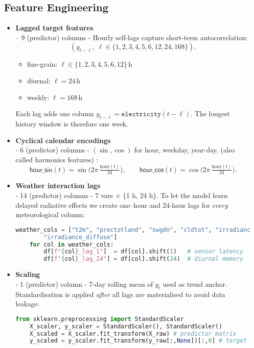 \subsection{Feature Engineering}
\label{subsec:feature-eng}

\begin{itemize}
    \item \textbf{Lagged target features} \\
    – 9 (predictor) columns - Hourly self‐lags capture short-term autocorrelation:
    \[
    (y_{t-\ell},\;\ell\in\{1,2,3,4,5,6,12,24,168\}).
    \]

    \begin{itemize}
        \item fine‐grain: $\ell\!\in\!\{1,2,3,4,5,6,12\}$\,h  
        \item diurnal:   $\ell=24$\,h  
        \item weekly:    $\ell=168$\,h
    \end{itemize}

    Each lag adds one column
    $y_{t-\ell}=\texttt{electricity}(t-\ell)$.  The longest history window is
    therefore one week.

    \item \textbf{Cyclical calendar encodings} \\
    - 6 (predictor) columns - $(\sin,\cos)$ for hour, weekday, year-day. (also called harmonics features) :
    \[
    \textsf{hour\_sin}(t)=\sin\!\bigl(2\pi\,\tfrac{\text{hour}(t)}{24}\bigr),\qquad
    \textsf{hour\_cos}(t)=\cos\!\bigl(2\pi\,\tfrac{\text{hour}(t)}{24}\bigr).
    \]
 
\newpage
    \item \textbf{Weather interaction lags} \\
    - 14 (predictor) columns - 7 vars $\times$ $\{$1 h, 24 h$\}$.
    To let the model learn delayed radiative effects we create one–hour and 24-hour lags for 
    \emph{every} meteorological column:
    \begin{lstlisting}[language=Python,caption={Python snippet: weather lag construction}]
        weather_cols = ["t2m", "prectotland", "swgdn", "cldtot", "irradiance_direct", 
        "irradiance_diffuse"]
    for col in weather_cols:
        df[f"{col}_lag_1"]  = df[col].shift(1)   # sensor latency
        df[f"{col}_lag_24"] = df[col].shift(24)  # diurnal memory
    \end{lstlisting}

    \item \textbf{Scaling} \\
    - 1 (predictor) column - 7-day rolling mean of $y_t$ used as trend anchor.
    Standardisation is applied \emph{after} all lags are materialised to avoid data leakage:

    \begin{lstlisting}[language=Python,caption={Python snippet: feature/target scaling}]
    from sklearn.preprocessing import StandardScaler
    X_scaler, y_scaler = StandardScaler(), StandardScaler()
    X_scaled = X_scaler.fit_transform(X_raw) # predictor matrix
    y_scaled = y_scaler.fit_transform(y_raw[:,None])[:,0] # target vector
    \end{lstlisting}
\end{itemize}

